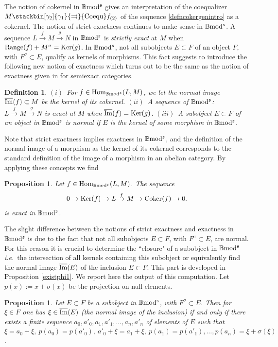 \documentclass[12pt]{article}
\newtheorem{prop}[thm]{Proposition}
\newtheorem{defn}[thm]{Definition}
\def\Hom{{\rm Hom}}
\def\Ker{{\rm Ker}}
\def\coker{{\rm Coker}}
\def\coequ{{\rm Coequ}}
\def\B{{\mathbb B}}
\def\imm{\overline{\rm Im}}
\def\strg{strict }
\def\strgly{strictly }
\newcommand{\ie}{{\it i.e.\/}\ }
\def\ker{{\mbox{Ker}}}
\def\Hom {{\mbox{Hom}}}
\def\b2{{\rm \B mod^{\mathfrak s}}}
\begin{document}
The notion of cokernel in  $\b2$ gives an interpretation of the coequalizer $M \stackbin[\gamma_2]{\gamma_1}{\rightrightarrows}\coequ f_{(2)}
$ of the sequence \eqref{defncokergenintro} as a cokernel.
The notion of \strg exactness continues to make sense in $\b2$. A sequence   $L\stackrel{f}{\to} M\stackrel{g}{\to}N$ in $\b2$ is {\em \strgly exact} at $M$ when 
$
	{\rm Range}(f)+M^\sigma=\ker(g) 
$. In $\b2$,  not all subobjects $E\subset F$ of an object $F$, with $F^\sigma\subset E$, qualify as kernels of morphisms. This fact suggests to introduce the following new  notion of exactness which turns out to be the same as the notion of exactness given in \cite{gra1} for semiexact categories.
\begin{defn}\label{exactnessb2bisintro}  $(i)$~For $f\in \Hom_\b2(L,M)$, we let the {\em normal image}  $\imm(f)\subset M$ be the kernel of its cokernel.\newline
  $(ii)$~A sequence  of $\b2$: $L\stackrel{f}{\to} M\stackrel{g}{\to}N$ is {\em  exact} at $M$ when $\imm(f)=\ker(g)$.\newline
  $(iii)$~A subobject $E\subset F$ of an object in $\b2$ is {\em normal} if $E$ is the kernel of some morphism in $\b2$.
 \end{defn}
  Note that \strg exactness  implies exactness in $\b2$, and the definition of the normal image of a morphism as the kernel of its cokernel corresponds to the standard definition of the image of a morphism in an abelian category.  By applying these concepts we find
      \begin{prop}\label{tentative1intro} Let $f\in\Hom_\b2(L,M)$. 
 The sequence 
$$
 	0 \to \Ker(f)\to L\stackrel{f}{\to}M\to \coker(f)\to 0.
 $$
 is exact in $\b2$.
\end{prop}
The slight difference between the notions of \strg exactness and exactness in $\b2$ is due to the fact that not all subobjects $E\subset F$, with $F^\sigma\subset E$, are normal. For this reason it is crucial to determine the ``closure" of a subobject in $\b2$ \ie the intersection of all kernels containing this subobject or equivalently find the normal  image $\imm(E)$ of the inclusion $E\subset F$.  This part is developed in Proposition \ref{existphi1}. We report here the output of this computation. Let $p(x):=x+\sigma(x)$ be the projection on null elements.
 \begin{prop}\label{existphi1intro} Let $E\subset F$ be a subobject in $\b2$, with $F^\sigma\subset E$. Then for $\xi \in F$ one has  $\xi \in \imm(E)$ (the normal image of the inclusion) if and only if there exists a finite sequence $a_0,a'_0,a_1,a'_1,\ldots, a_n,a'_n$ of elements of $E$ such that 
 $
 \xi=a_0+\xi,\ p(a_0)=p(a'_0),\ a'_0+\xi=a_1+\xi,\ p(a_1)=p(a'_1), \ldots, p(a_n)=\xi+\sigma(\xi)
 $.
  \end{prop} 
\end{document}
